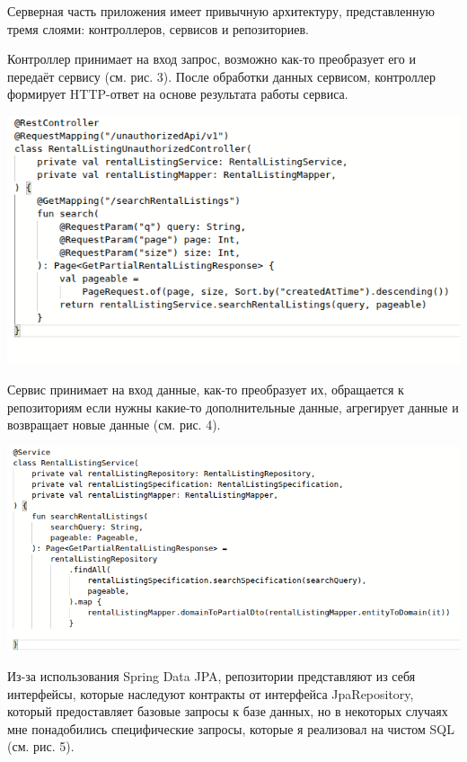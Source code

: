 \documentclass[14pt]{extarticle}
\begin{document}
\bigskip

Серверная часть приложения имеет привычную архитектуру,
представленную тремя слоями: контроллеров, сервисов и репозиториев.

Контроллер принимает на вход запрос, возможно как-то преобразует его
и передаёт сервису (см. рис. 3). После обработки данных сервисом, контроллер
формирует HTTP-ответ на основе результата работы сервиса.

\begin{center}
    \includegraphics[width=1.0\textwidth]{controller.png}
\end{center}

Сервис принимает на вход данные, как-то преобразует их, обращается к репозиториям
если нужны какие-то дополнительные данные, агрегирует данные и возвращает
новые данные (см. рис. 4).

\begin{center}
    \includegraphics[width=1.0\textwidth]{service.png}
\end{center}

Из-за использования Spring Data JPA, репозитории представляют из себя
интерфейсы, которые наследуют контракты от интерфейса JpaRepository,
который предоставляет базовые запросы к базе данных, но в некоторых случаях
мне понадобились специфические запросы, которые я реализовал на чистом SQL
(см. рис. 5).
\end{document}
